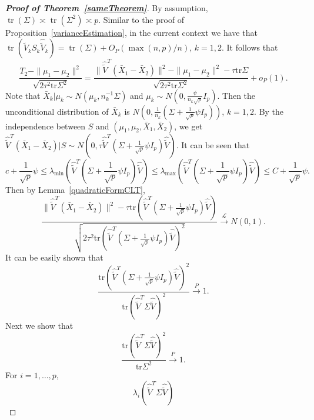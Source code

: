 \documentclass[review]{elsarticle}
\DeclareMathOperator{\mytr}{tr}
\theoremstyle{plain}
\theoremstyle{definition}
\theoremstyle{remark}
\begin{document}
\begin{proof}[\textbf{Proof of Theorem~\ref{sameTheorem}}]
    By assumption, $\mytr (\Sigma)\asymp \mytr (\Sigma^2)\asymp p$.
    Similar to the proof of Proposition~\ref{varianceEstimation}, in the current context we have that
    $\mytr(\hat{\tilde{V}}_k S_k \hat{\tilde{V}}_k)=\mytr(\Sigma)+O_P({\max(n,p)}/{n})$, $k=1,2$. It follows that
    $$
    \frac{T_2-\|\mu_1-\mu_2\|^2}{\sqrt{2\tau^2 \mathrm{tr}\Sigma^2}}
    =
    \frac{\|\hat{\tilde{V}}^T(\bar{X}_1-\bar{X}_2)\|^2-\|\mu_1-\mu_2\|^2-\tau \mathrm{tr}\Sigma}{\sqrt{2\tau^2 \mathrm{tr}\Sigma^2}}+o_P(1).
    $$
    Note that $\bar{X}_k|\mu_k\sim N(\mu_k,{n_k^{-1}}\Sigma)$ and
    $\mu_k\sim N(0,\frac{\psi}{n_k\sqrt{p}}I_p)$. Then the unconditional distribution of $\bar{X}_k$ is $N(0,\frac{1}{n_k}(\Sigma+\frac{1}{\sqrt{p}}\psi I_p))$, $k=1,2$.
    By the independence between $S$ and $(\mu_1,\mu_2,\bar{X}_1,\bar{X}_2)$, we get $\hat{\tilde{V}}^T(\bar{X}_1-\bar{X}_2)|S\sim N(0,\tau\hat{\tilde{V}}^T(\Sigma+\frac{1}{\sqrt{p}}\psi I_p)\hat{\tilde{V}})$.
    It can be seen that
    $$
    c+\frac{1}{\sqrt{p}}\psi
    \leq
    \lambda_{\min}(\hat{\tilde{V}}^T(\Sigma+\frac{1}{\sqrt{p}}\psi I_p)\hat{\tilde{V}})
    \leq
    \lambda_{\max}(\hat{\tilde{V}}^T(\Sigma+\frac{1}{\sqrt{p}}\psi I_p)\hat{\tilde{V}})
    \leq C+\frac{1}{\sqrt{p}}\psi.
    $$
    Then by Lemma~\ref{quadraticFormCLT},
    \begin{equation}\label{sameTheorem:5}
    \frac{\|\hat{\tilde{V}}^T(\bar{X}_1-\bar{X}_2)\|^2-\tau\mathrm{tr}(\hat{\tilde{V}}^T(\Sigma+\frac{1}{\sqrt{p}}\psi I_p)\hat{\tilde{V}})}{\sqrt{2\tau^2\mathrm{tr}(\hat{\tilde{V}}^T(\Sigma+\frac{1}{\sqrt{p}}\psi I_p)\hat{\tilde{V}})^2}}\xrightarrow{\mathcal{L}}N(0,1).
    \end{equation}
    It can be easily shown that
    \begin{equation}\label{sameTheorem:4}
    \frac{\mathrm{tr}(\hat{\tilde{V}}^T(\Sigma+\frac{1}{\sqrt{p}}\psi I_p)\hat{\tilde{V}})^2}{\mathrm{tr}(\hat{\tilde{V}}^T\Sigma\hat{\tilde{V}})^2}\xrightarrow{P}1.
\end{equation}
    Next we show that
    \begin{equation}\label{sameTheorem:3}
    \frac{\mathrm{tr}(\hat{\tilde{V}}^T\Sigma\hat{\tilde{V}})^2}{\mathrm{tr}\Sigma^2
    }\xrightarrow{P}1.
    \end{equation}
For $i=1,\ldots,p$, 
    \begin{equation}\label{sameTheorem:1}
    \lambda_i (\hat{\tilde{V}}^T \Sigma \hat{\tilde{V}})

\end{equation}
\end{proof}
\end{document}
